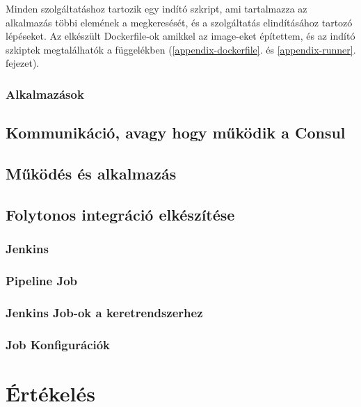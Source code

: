 \documentclass[11pt,magyar,a4paper,twoside,]{report}
\begin{document}
Minden szolgáltatáshoz tartozik egy indító szkript, ami tartalmazza az
alkalmazás többi elemének a megkeresését, és a szolgáltatás
elindításához tartozó lépéseket. Az elkészült Dockerfile-ok amikkel az
image-eket építettem, és az indító szkiptek megtalálhatók a függelékben
(\ref{appendix-dockerfile}. és \ref{appendix-runner}. fejezet).

\subsection{Alkalmazások}\label{alkalmazuxe1sok}

\section{Kommunikáció, avagy hogy működik a
Consul}\label{kommunikuxe1ciuxf3-avagy-hogy-mux171kuxf6dik-a-consul}

\section{Működés és
alkalmazás}\label{mux171kuxf6duxe9s-uxe9s-alkalmazuxe1s}

\section{Folytonos integráció
elkészítése}\label{folytonos-integruxe1ciuxf3-elkuxe9szuxedtuxe9se}

\subsection{Jenkins}\label{jenkins}

\subsection{Pipeline Job}\label{pipeline-job}

\subsection{Jenkins Job-ok a
keretrendszerhez}\label{jenkins-job-ok-a-keretrendszerhez}

\subsection{Job Konfigurációk}\label{job-konfiguruxe1ciuxf3k}

\chapter{Értékelés}\label{uxe9rtuxe9keluxe9s}
\end{document}
